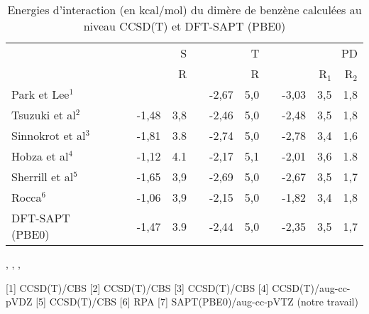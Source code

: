\documentclass[12pt,a4paper]{book}
\begin{document}
	\begin{table}[H]
		\caption{Energies d'interaction (en kcal/mol) du dimère de benzène calculées au niveau CCSD(T) et DFT-SAPT (PBE0)}
		\begin{center}
			\begin{tabular}{l c r r r c r r c r r r}
				\toprule
				& & & \multicolumn{2}{p{2cm}}{\centering S}  &	& \multicolumn{2}{p{2cm}}{\centering
					T}& &\multicolumn{3}{p{3cm}}{\centering PD}\\
				\cline{4-12}
				& & & & R & &  &  R & & & R$_{1}$ & R$_{2}$ \\
				\midrule
				Park et Lee$^{1}$ & & & &  & &-2,67& 5,0 & &-3,03 & 3,5 & 1,8\\
				Tsuzuki et al$^{2}$ & & & -1,48& 3,8 &  &-2,46& 5,0&  & -2,48 & 3,5& 1,8\\
				Sinnokrot et al$^{3}$ & & & -1,81 & 3.8 & &-2,74& 5,0&  & -2,78 & 3,4 & 1,6\\
				Hobza et al$^{4}$ & & &-1,12 & 4.1 &  &-2,17& 5,1& & -2,01 & 3,6 & 1.8\\
				Sherrill et al$^{5}$& &  & -1,65 & 3,9 & & -2,69& 5,0 & & -2,67 & 3,5 & 1,7 \\
				Rocca$^{6}$ & & & -1,06& 3,9& & -2,15& 5,0 & & -1,82 & 3,4 & 1,8\\ 
				DFT-SAPT (PBE0) & & & -1,47 & 3.9 &  &-2,44 &5,0& & -2,35& 3,5 &1,7\\
				\bottomrule
			\end{tabular}
		\end{center}
		\centering
		,
		,
		,
		
		[1] CCSD(T)/CBS
		[2] CCSD(T)/CBS 
		[3] CCSD(T)/CBS
		[4] CCSD(T)/aug-cc-pVDZ
		[5] CCSD(T)/CBS 
		[6] RPA
		[7] SAPT(PBE0)/aug-cc-pVTZ (notre travail)
		
		\label{benzene}
	\end{table}
	
	
	
	
	
	
	
	
	
	
	
	\newpage
\end{document}
